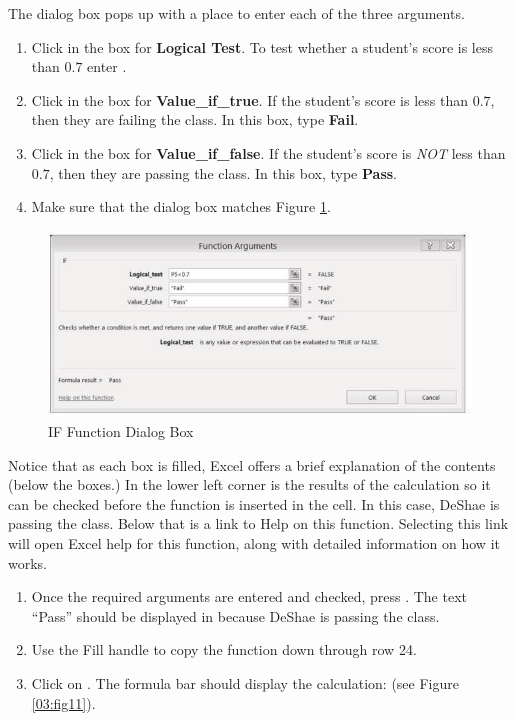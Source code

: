 The  dialog box pops up with a place to enter each of the three arguments.

\begin{enumerate}
	\item Click in the box for \textbf{Logical Test}. To test whether a student's score is less than $ 0.7 $ enter .
	\item Click in the box for \textbf{Value\_if\_true}. If the student's score is less than $ 0.7 $, then they are failing the class. In this box, type \textbf{Fail}.
	\item Click in the box for \textbf{Value\_if\_false}. If the student's score is \textit{NOT} less than $ 0.7 $, then they are passing the class. In this box, type \textbf{Pass}.
	\item Make sure that the dialog box matches Figure \ref{03:fig10}.
\end{enumerate}

\begin{figure}[H]
	\centering
	\includegraphics[width=\maxwidth{.95\linewidth}]{gfx/ch03_fig10}
	\caption{IF Function Dialog Box}
	\label{03:fig10}
\end{figure}

Notice that as each box is filled, Excel offers a brief explanation of the contents (below the boxes.) In the lower left corner is the results of the calculation so it can be checked before the function is inserted in the cell. In this case, DeShae is passing the class. Below that is a link to Help on this function. Selecting this link will open Excel help for this function, along with detailed information on how it works.

\begin{enumerate}[resume]
	\item Once the required arguments are entered and checked, press . The text ``Pass'' should be displayed in  because DeShae is passing the class.
	\item Use the Fill handle to copy the  function down through row 24.
	\item Click on . The formula bar should display the  calculation:  (see Figure \ref{03:fig11}).
\end{enumerate}

